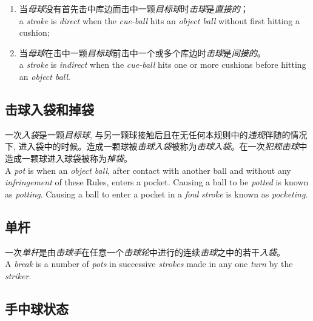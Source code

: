 \begin{enumerate}[label=(\alph*)]
    \begin{enumerate}[label=(\roman*)]
        \item 当\textit{母球}没有首先击中库边而击中一颗\textit{目标球}时\textit{击球}是\textit{直接的}；\\
        a \textit{stroke} is \textit{direct} when the \textit{cue-ball} hits an \textit{object ball} without first hitting a cushion;
        \item 当\textit{母球}在击中一颗\textit{目标球}前击中一个或多个库边时\textit{击球}是\textit{间接的}。\\
        a \textit{stroke} is \textit{indirect} when the \textit{cue-ball} hits one or more cushions before hitting an \textit{object ball}.
    \end{enumerate}
\end{enumerate}

\subsection{击球入袋和掉袋}

\noindent 一次\textit{入袋}是一颗\textit{目标球}, 与另一颗球接触后且在无任何本规则中的\textit{违规}伴随的情况下, 进入袋中的时候。造成一颗球被\textit{击球入袋}被称为\textit{击球入袋}。在一次\textit{犯规}\textit{击球}中造成一颗球进入球袋被称为\textit{掉袋}。\\
A \textit{pot} is when an \textit{object ball}, after contact with another ball and without any \textit{infringement} of these Rules, enters a pocket. Causing a ball to be \textit{potted} is known as \textit{potting}. Causing a ball to enter a pocket in a \textit{foul} \textit{stroke} is known as \textit{pocketing}.

\subsection{单杆}

\noindent 一次\textit{单杆}是由\textit{击球手}在任意一个\textit{击球轮}中进行的连续\textit{击球}之中的若干\textit{入袋}。\\
A \textit{break} is a number of \textit{pots} in successive \textit{strokes} made in any one \textit{turn} by the \textit{striker}.

\subsection{手中球状态}

